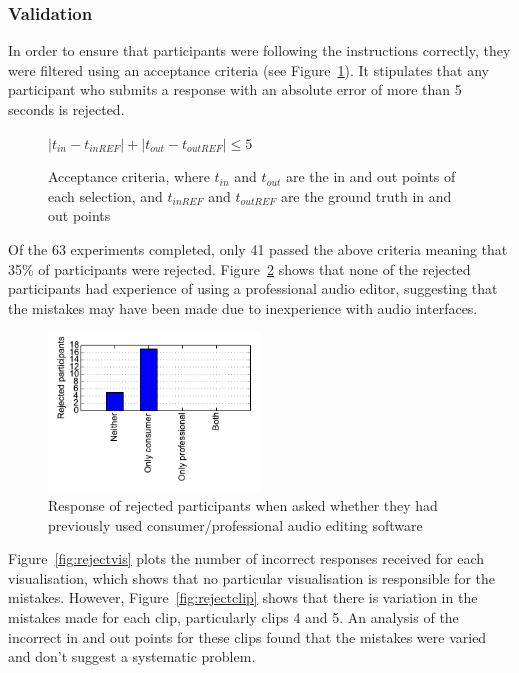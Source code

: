\subsubsection{Validation}
In order to ensure that participants were following the instructions correctly,
they were filtered using an acceptance criteria (see Figure~\ref{eq:accept}).
It stipulates that any participant who submits a response with an absolute
error of more than 5 seconds is rejected.

\begin{figure}[ht]
  \begin{center}
    $ |t_{in}-t_{inREF}| + |t_{out}-t_{outREF}| \leq 5 $
  \end{center}
  \caption{Acceptance criteria, where $t_{in}$ and $t_{out}$ are the in and out
    points of each selection, and $t_{inREF}$ and $t_{outREF}$ are the ground
    truth in and out points}
  \label{eq:accept}
\end{figure}

Of the 63 experiments completed, only 41 passed the above criteria meaning that
35\% of participants were rejected. Figure~\ref{fig:rejectdaw} shows that none
of the rejected participants had experience of using a professional audio
editor, suggesting that the mistakes may have been made due to inexperience
with audio interfaces.

\begin{figure}[ht]
  \centering
  \includegraphics[width=0.5\textwidth]{figs/reject-daw.pdf}
  \caption{Response of rejected participants when asked whether they had
    previously used consumer/professional audio editing software}
  \label{fig:rejectdaw}
\end{figure}

Figure~\ref{fig:rejectvis} plots the number of incorrect responses received for
each visualisation, which shows that no particular visualisation is responsible
for the mistakes. However, Figure~\ref{fig:rejectclip} shows that there is
variation in the mistakes made for each clip, particularly clips 4 and 5. An
analysis of the incorrect in and out points for these clips found that
the mistakes were varied and don't suggest a systematic problem. 

